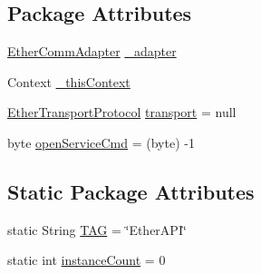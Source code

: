 \subsection*{Package Attributes}
\begin{DoxyCompactItemize}
\item 
\mbox{\hyperlink{classcom_1_1ethernom_1_1android_1_1etherapi_1_1link_layer_1_1_ether_comm_adapter}{Ether\+Comm\+Adapter}} \mbox{\hyperlink{classcom_1_1ethernom_1_1android_1_1etherapi_1_1_ether_a_p_i_a710ea8ed5f8f9be00337e40222b61c1f}{\+\_\+adapter}}
\item 
Context \mbox{\hyperlink{classcom_1_1ethernom_1_1android_1_1etherapi_1_1_ether_a_p_i_a113571675a5e5609c38406b367dd28d5}{\+\_\+this\+Context}}
\item 
\mbox{\hyperlink{classcom_1_1ethernom_1_1android_1_1etherapi_1_1_ether_transport_protocol}{Ether\+Transport\+Protocol}} \mbox{\hyperlink{classcom_1_1ethernom_1_1android_1_1etherapi_1_1_ether_a_p_i_a5af3360721f7c9fadd6221855fa3f4f8}{transport}} = null
\item 
byte \mbox{\hyperlink{classcom_1_1ethernom_1_1android_1_1etherapi_1_1_ether_a_p_i_aa6f9befe15c863aac9e90acb9b0ab387}{open\+Service\+Cmd}} = (byte) -\/1
\end{DoxyCompactItemize}
\subsection*{Static Package Attributes}
\begin{DoxyCompactItemize}
\item 
static String \mbox{\hyperlink{classcom_1_1ethernom_1_1android_1_1etherapi_1_1_ether_a_p_i_a88a61879042281174ee0a959e69be645}{T\+AG}} = \char`\"{}Ether\+A\+PI\char`\"{}
\item 
static int \mbox{\hyperlink{classcom_1_1ethernom_1_1android_1_1etherapi_1_1_ether_a_p_i_a1ec445aeb00f2279e790f0095a891184}{instance\+Count}} = 0
\end{DoxyCompactItemize}
